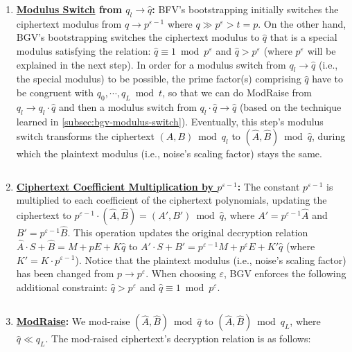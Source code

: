 \begin{enumerate}

\item \textbf{\underline{Modulus Switch} from \boldmath$q_l \rightarrow \hat{q}$:} BFV's bootstrapping initially switches the ciphertext modulus from $q \rightarrow p^{\varepsilon-1}$ where $q \gg p^\varepsilon > t = p$. On the other hand, BGV's bootstrapping switches the ciphertext modulus to $\hat{q}$ that is a special modulus satisfying the relation: $\hat{q} \equiv 1 \bmod p^\varepsilon$ and $\hat{q} > p^\varepsilon$ (where $p^\varepsilon$ will be explained in the next step). In order for a modulus switch from $q_l \rightarrow \hat{q}$ (i.e., the special modulus) to be possible, the prime factor(s) comprising $\hat{q}$ have to be congruent with $q_{0}, \cdots, q_L \bmod t$, so that we can do \textsf{ModRaise} from $q_l \rightarrow q_l\cdot \hat{q}$ and then a modulus switch from $q_l\cdot \hat{q} \rightarrow \hat{q}$ (based on the technique learned in \autoref{subsec:bgv-modulus-switch}). Eventually, this step's modulus switch transforms the ciphertext $(A, B) \bmod q_l$ to $(\hat{A}, \hat{B}) \bmod \hat{q}$, during which the plaintext modulus (i.e., noise's scaling factor) stays the same. 

$ $

\item \textbf{\underline{Ciphertext Coefficient Multiplication by \boldmath$p^{\varepsilon-1}$}:} 
The constant $p^{\varepsilon-1}$ is multiplied to each coefficient of the ciphertext polynomials, updating the ciphertext to $p^{\varepsilon-1} \cdot (\hat{A}, \hat{B}) = (A', B') \bmod \hat{q}$, where $A' = p^{\varepsilon-1}\hat{A}$ and $B' = p^{\varepsilon-1}\hat{B}$. This operation updates the original decryption relation $\hat{A}\cdot S + \hat{B} = M + p E + K\hat{q}$ to $A'\cdot S + B' = p^{\varepsilon-1} M + p^\varepsilon E + K'\hat{q}$ (where $K' = K \cdot p^{\varepsilon - 1}$). Notice that the plaintext modulus (i.e., noise's scaling factor) has been changed from $p \rightarrow p^\varepsilon$. When choosing $\varepsilon$, BGV enforces the following additional constraint: $\hat{q} > p^\varepsilon$ and $\hat{q}  \equiv 1 \bmod p^\varepsilon$.

$ $

\item \textbf{\underline{\textsf{ModRaise}}:} We mod-raise $(\hat{A}, \hat{B}) \bmod \hat{q}$ to $(\hat{A}, \hat{B}) \bmod q_L$, where $\hat{q} \ll q_L$. The mod-raised ciphertext's decryption relation is as follows:


\end{enumerate}
